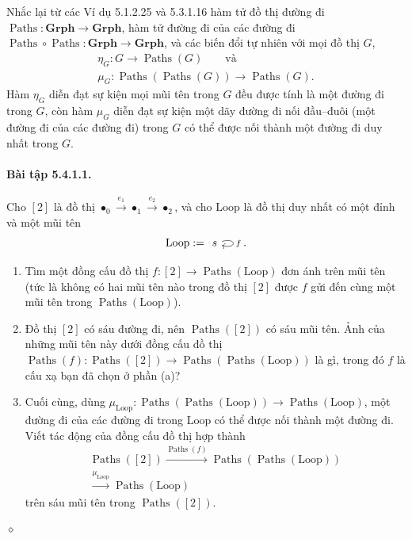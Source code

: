 Nhắc lại từ các Ví dụ 5.1.2.25 và 5.3.1.16 hàm tử đồ thị đường đi $\operatorname{Paths}:\mathbf{Grph}\to\mathbf{Grph}$, hàm tử đường đi của các đường đi $\operatorname{Paths}\circ\operatorname{Paths}:\mathbf{Grph}\to\mathbf{Grph}$, và các biến đổi tự nhiên với mọi đồ thị $G$,
\begin{equation*}\begin{gathered}\eta_G:G\longrightarrow\operatorname{Paths}(G)\qquad\text{và}\\\mu_G:\operatorname{Paths}(\operatorname{Paths}(G))\longrightarrow\operatorname{Paths}(G).\end{gathered}\tag{5.18}\end{equation*}
Hàm $\eta_G$ diễn đạt sự kiện mọi mũi tên trong $G$ đều được tính là một đường đi trong $G$, còn hàm $\mu_G$ diễn đạt sự kiện một dãy đường đi nối đầu--đuôi (một đường đi của các đường đi) trong $G$ có thể được nối thành một đường đi duy nhất trong $G$.
\paragraph{Bài tập 5.4.1.1.} Cho $[2]$ là đồ thị $\bullet_0\xrightarrow{e_1}\bullet_1\xrightarrow{e_2}\bullet_2$, và cho $\mathrm{Loop}$ là đồ thị duy nhất có một đỉnh và một mũi tên
\[\mathrm{Loop}:=\begin{tikzcd}s\arrow[loop right,"f"]\end{tikzcd}.\]
\begin{enumerate}[label=\alph*.]
\item Tìm một đồng cấu đồ thị $f:[2]\to\operatorname{Paths}(\mathrm{Loop})$ đơn ánh trên mũi tên (tức là không có hai mũi tên nào trong đồ thị $[2]$ được $f$ gửi đến cùng một mũi tên trong $\operatorname{Paths}(\mathrm{Loop})$).
\item Đồ thị $[2]$ có sáu đường đi, nên $\operatorname{Paths}([2])$ có sáu mũi tên. Ảnh của những mũi tên này dưới đồng cấu đồ thị $\operatorname{Paths}(f):\operatorname{Paths}([2])\to\operatorname{Paths}(\operatorname{Paths}(\mathrm{Loop}))$ là gì, trong đó $f$ là cấu xạ bạn đã chọn ở phần (a)?
\item Cuối cùng, dùng $\mu_{\mathrm{Loop}}:\operatorname{Paths}(\operatorname{Paths}(\mathrm{Loop}))\to\operatorname{Paths}(\mathrm{Loop})$, một đường đi của các đường đi trong $\mathrm{Loop}$ có thể được nối thành một đường đi. Viết tác động của đồng cấu đồ thị hợp thành
\[\begin{gathered}\operatorname{Paths}([2])\xrightarrow{\operatorname{Paths}(f)}\operatorname{Paths}(\operatorname{Paths}(\mathrm{Loop}))\\\xrightarrow{\mu_{\mathrm{Loop}}}\operatorname{Paths}(\mathrm{Loop})\end{gathered}\]
trên sáu mũi tên trong $\operatorname{Paths}([2])$.
\end{enumerate}\hfill$\diamond$
